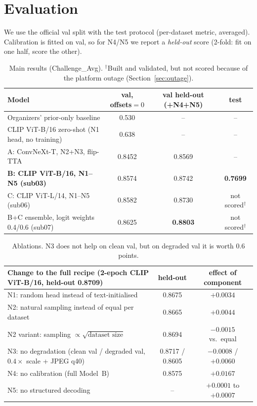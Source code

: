 \documentclass[10pt,a4paper]{article}
\begin{document}
\section{Evaluation}
We use the official val split with the test protocol (per-dataset metric, averaged). Calibration is fitted on val,
so for N4/N5 we report a \emph{held-out} score (2-fold: fit on one half, score the other).

\begin{table}[h]
\centering\small
\begin{tabular}{@{}lccc@{}}
\toprule
Model & val, offsets$=0$ & val held-out (+N4+N5) & \textbf{test} \\
\midrule
Organizers' prior-only baseline & 0.530 & -- & -- \\
CLIP ViT-B/16 zero-shot (N1 head, no training) & 0.638 & -- & -- \\
A: ConvNeXt-T, N2+N3, flip-TTA & 0.8452 & 0.8569 & -- \\
\textbf{B: CLIP ViT-B/16, N1--N5 (sub03)} & 0.8574 & 0.8742 & \textbf{0.7699} \\
C: CLIP ViT-L/14, N1--N5 (sub06) & 0.8582 & 0.8730 & not scored$^\dagger$ \\
B+C ensemble, logit weights 0.4/0.6 (sub07) & 0.8625 & \textbf{0.8803} & not scored$^\dagger$ \\
\bottomrule
\end{tabular}
\caption{Main results (Challenge\_Avg). $^\dagger$Built and validated, but not scored because of the platform outage (Section~\ref{sec:outage}).}
\label{tab:main}
\end{table}

\begin{table}[h]
\centering\small
\begin{tabular}{@{}lcc@{}}
\toprule
Change to the full recipe (2-epoch CLIP ViT-B/16, held-out 0.8709) & held-out & effect of component \\
\midrule
N1: random head instead of text-initialised & 0.8675 & $+0.0034$ \\
N2: natural sampling instead of equal per dataset & 0.8665 & $+0.0044$ \\
N2 variant: sampling $\propto\sqrt{\text{dataset size}}$ & 0.8694 & $-0.0015$ vs.\ equal \\
N3: no degradation (clean val / degraded val, $0.4\times$ scale + JPEG q40) & 0.8717 / 0.8605 & $-0.0008$ / $+0.0060$ \\
N4: no calibration (full Model~B) & 0.8575 & $+0.0167$ \\
N5: no structured decoding & -- & $+0.0001$ to $+0.0007$ \\
\bottomrule
\end{tabular}
\caption{Ablations. N3 does not help on clean val, but on degraded val it is worth 0.6 points.}
\label{tab:abl}
\end{table}
\end{document}
